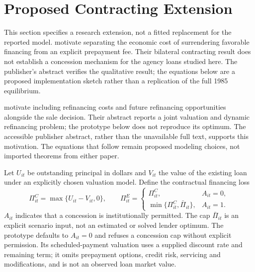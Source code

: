 \section{Proposed Contracting Extension}\label{app:contractingextension}

This section specifies a research extension, not a fitted replacement for the reported model. \citet{dunnspatt1985} motivate separating the economic cost of surrendering favorable financing from an explicit prepayment fee. Their bilateral contracting result does not establish a concession mechanism for the agency loans studied here. The publisher's abstract verifies the qualitative result; the equations below are a proposed implementation sketch rather than a replication of the full 1985 equilibrium.

\citet{dunnspatt2005} motivate including refinancing costs and future refinancing opportunities alongside the sale decision. Their abstract reports a joint valuation and dynamic refinancing problem; the prototype below does not reproduce its optimum. The accessible publisher abstract, rather than the unavailable full text, supports this motivation. The equations that follow remain proposed modeling choices, not imported theorems from either paper.

Let $U_{it}$ be outstanding principal in dollars and $V_{it}$ the value of the existing loan under an explicitly chosen valuation model. Define the contractual financing loss
\begin{equation}
\Pi^{C}_{it}=\max\{U_{it}-V_{it},0\},\qquad
\Pi^{E}_{it}=\begin{cases}
\Pi^{C}_{it},&A_{it}=0,\\
\min\{\Pi^{C}_{it},\bar\Pi_{it}\},&A_{it}=1.
\end{cases}
\label{eq:contractcost}
\end{equation}
$A_{it}$ indicates that a concession is institutionally permitted. The cap $\bar\Pi_{it}$ is an explicit scenario input, not an estimated or solved lender optimum. The prototype defaults to $A_{it}=0$ and refuses a concession cap without explicit permission. Its scheduled-payment valuation uses a supplied discount rate and remaining term; it omits prepayment options, credit risk, servicing and modifications, and is not an observed loan market value.

